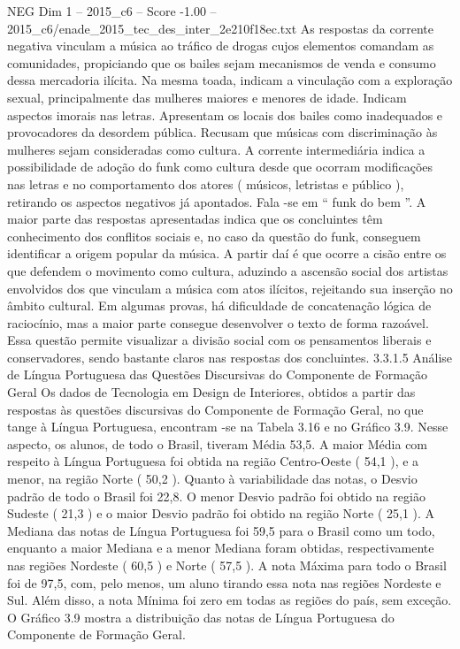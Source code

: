 \begin{textsample}{NEG Dim 1 – 2015\_c6 – Score -1.00 – 2015\_c6/enade\_2015\_tec\_des\_inter\_2e210f18ec.txt}
As respostas da corrente negativa vinculam a música ao tráfico de drogas cujos elementos comandam as comunidades, propiciando que os bailes sejam mecanismos de venda e consumo dessa mercadoria ilícita.
Na mesma toada, indicam a vinculação com a exploração sexual, principalmente das mulheres maiores e menores de idade.
Indicam aspectos imorais nas letras.
Apresentam os locais dos bailes como inadequados e provocadores da desordem pública.
Recusam que músicas com discriminação às mulheres sejam consideradas como cultura.
A corrente intermediária indica a possibilidade de adoção do funk como cultura desde que ocorram modificações nas letras e no comportamento dos atores ( músicos, letristas e público ), retirando os aspectos negativos já apontados.
Fala -se em “ funk do bem ”.
A maior parte das respostas apresentadas indica que os concluintes têm conhecimento dos conflitos sociais e, no caso da questão do funk, conseguem identificar a origem popular da música.
A partir daí é que ocorre a cisão entre os que defendem o movimento como cultura, aduzindo a ascensão social dos artistas envolvidos dos que vinculam a música com atos ilícitos, rejeitando sua inserção no âmbito cultural.
Em algumas provas, há dificuldade de concatenação lógica de raciocínio, mas a maior parte consegue desenvolver o texto de forma razoável.
Essa questão permite visualizar a divisão social com os pensamentos liberais e conservadores, sendo bastante claros nas respostas dos concluintes. 3.3.1.5 Análise de Língua Portuguesa das Questões Discursivas do Componente de Formação Geral Os dados de Tecnologia em Design de Interiores, obtidos a partir das respostas às questões discursivas do Componente de Formação Geral, no que tange à Língua Portuguesa, encontram -se na Tabela 3.16 e no Gráfico 3.9.
Nesse aspecto, os alunos, de todo o Brasil, tiveram Média 53,5.
A maior Média com respeito à Língua Portuguesa foi obtida na região Centro-Oeste ( 54,1 ), e a menor, na região Norte ( 50,2 ).
Quanto à variabilidade das notas, o Desvio padrão de todo o Brasil foi 22,8.
O menor Desvio padrão foi obtido na região Sudeste ( 21,3 ) e o maior Desvio padrão foi obtido na região Norte ( 25,1 ).
A Mediana das notas de Língua Portuguesa foi 59,5 para o Brasil como um todo, enquanto a maior Mediana e a menor Mediana foram obtidas, respectivamente nas regiões Nordeste ( 60,5 ) e Norte ( 57,5 ).
A nota Máxima para todo o Brasil foi de 97,5, com, pelo menos, um aluno tirando essa nota nas regiões Nordeste e Sul.
Além disso, a nota Mínima foi zero em todas as regiões do país, sem exceção.
O Gráfico 3.9 mostra a distribuição das notas de Língua Portuguesa do Componente de Formação Geral.

\end{textsample}
